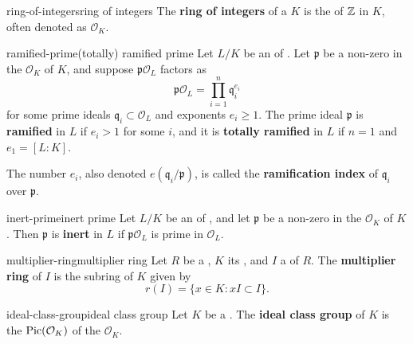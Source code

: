 \begin{topic}{ring-of-integers}{ring of integers}
    The \textbf{ring of integers} of a  $K$ is the  of $\mathbb{Z}$ in $K$, often denoted as $\mathcal{O}_K$. %
\end{topic}

\begin{topic}{ramified-prime}{(totally) ramified prime}
    Let $L/K$ be an  of . Let $\mathfrak{p}$ be a non-zero  in the  $\mathcal{O}_K$ of $K$, and suppose $\mathfrak{p} \mathcal{O}_L$ factors as
    \[ \mathfrak{p} \mathcal{O}_L = \prod_{i = 1}^{n} \mathfrak{q}_i^{e_i} \]
    for some prime ideals $\mathfrak{q}_i \subset \mathcal{O}_L$ and exponents $e_i \ge 1$.
    The prime ideal $\mathfrak{p}$ is \textbf{ramified} in $L$ if $e_i > 1$ for some $i$, and it is \textbf{totally ramified} in $L$ if $n = 1$ and $e_1 = [L : K]$.
    
    The number $e_i$, also denoted $e(\mathfrak{q}_i / \mathfrak{p})$, is called the \textbf{ramification index} of $\mathfrak{q}_i$ over $\mathfrak{p}$.
\end{topic}

\begin{topic}{inert-prime}{inert prime}
    Let $L/K$ be an  of , and let $\mathfrak{p}$ be a non-zero  in the  $\mathcal{O}_K$ of $K$. Then $\mathfrak{p}$ is \textbf{inert} in $L$ if $\mathfrak{p} \mathcal{O}_L$ is prime in $\mathcal{O}_L$.
\end{topic}

\begin{topic}{multiplier-ring}{multiplier ring}
    Let $R$ be a , $K$ its , and $I$ a  of $R$. The \textbf{multiplier ring} of $I$ is the subring of $K$ given by
    \[ r(I) = \{ x \in K : x I \subset I \} . \]
\end{topic}

\begin{topic}{ideal-class-group}{ideal class group}
    Let $K$ be a . The \textbf{ideal class group} of $K$ is the  $\textup{Pic}(\mathcal{O}_K)$ of the  $\mathcal{O}_K$.
\end{topic}

